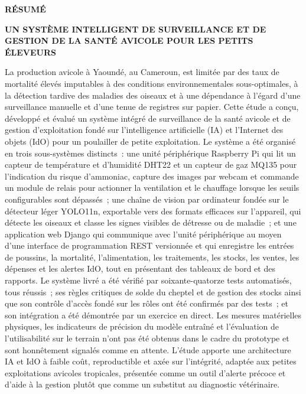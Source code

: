 \documentclass[12pt,a4paper]{report}
\begin{document}
\clearpage
\begin{center}
{\Large\bfseries R\'ESUM\'E}
\end{center}
\vspace{0.6cm}

\begin{center}
{\bfseries UN SYST\`EME INTELLIGENT DE SURVEILLANCE ET DE GESTION DE LA SANT\'E AVICOLE POUR LES PETITS \'ELEVEURS}
\end{center}
\vspace{0.6cm}

La production avicole \`a Yaound\'e, au Cameroun, est limit\'ee par des taux de mortalit\'e \'elev\'es imputables \`a des conditions environnementales sous-optimales, \`a la d\'etection tardive des maladies des oiseaux et \`a une d\'ependance \`a l'\'egard d'une surveillance manuelle et d'une tenue de registres sur papier. Cette \'etude a con\c{c}u, d\'evelopp\'e et \'evalu\'e un syst\`eme int\'egr\'e de surveillance de la sant\'e avicole et de gestion d'exploitation fond\'e sur l'intelligence artificielle (IA) et l'Internet des objets (IdO) pour un poulailler de petite exploitation. Le syst\`eme a \'et\'e organis\'e en trois sous-syst\`emes distincts~: une unit\'e p\'eriph\'erique Raspberry Pi qui lit un capteur de temp\'erature et d'humidit\'e DHT22 et un capteur de gaz MQ135 pour l'indication du risque d'ammoniac, capture des images par webcam et commande un module de relais pour actionner la ventilation et le chauffage lorsque les seuils configurables sont d\'epass\'es~; une cha\^ine de vision par ordinateur fond\'ee sur le d\'etecteur l\'eger YOLO11n, exportable vers des formats efficaces sur l'appareil, qui d\'etecte les oiseaux et classe les signes visibles de d\'etresse ou de maladie~; et une application web Django qui communique avec l'unit\'e p\'eriph\'erique au moyen d'une interface de programmation REST versionn\'ee et qui enregistre les entr\'ees de poussins, la mortalit\'e, l'alimentation, les traitements, les stocks, les ventes, les d\'epenses et les alertes IdO, tout en pr\'esentant des tableaux de bord et des rapports. Le syst\`eme livr\'e a \'et\'e v\'erifi\'e par soixante-quatorze tests automatis\'es, tous r\'eussis~; ses r\`egles critiques de solde du cheptel et de gestion des stocks ainsi que son contr\^ole d'acc\`es fond\'e sur les r\^oles ont \'et\'e confirm\'es par des tests~; et son int\'egration a \'et\'e d\'emontr\'ee par un exercice en direct. Les mesures mat\'erielles physiques, les indicateurs de pr\'ecision du mod\`ele entra\^in\'e et l'\'evaluation de l'utilisabilit\'e sur le terrain n'ont pas \'et\'e obtenus dans le cadre du prototype et sont honn\^etement signal\'es comme en attente. L'\'etude apporte une architecture IA et IdO \`a faible co\^ut, reproductible et ax\'ee sur l'int\'egrit\'e, adapt\'ee aux petites exploitations avicoles tropicales, pr\'esent\'ee comme un outil d'alerte pr\'ecoce et d'aide \`a la gestion plut\^ot que comme un substitut au diagnostic v\'et\'erinaire.
\end{document}
